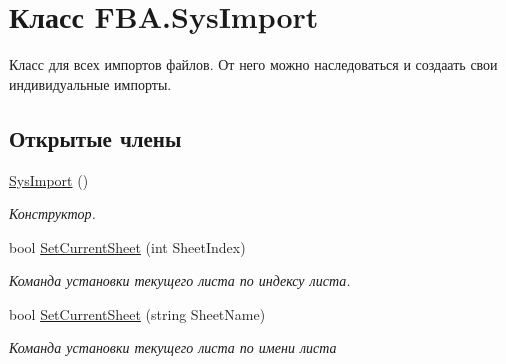 \hypertarget{class_f_b_a_1_1_sys_import}{}\section{Класс F\+B\+A.\+Sys\+Import}
\label{class_f_b_a_1_1_sys_import}


Класс для всех импортов файлов. От него можно наследоваться и создаать свои индивидуальные импорты.  


\subsection*{Открытые члены}
\begin{DoxyCompactItemize}
\item 
\mbox{\hyperlink{class_f_b_a_1_1_sys_import_a95e27f0adbca1a2f8d289e604164f520}{Sys\+Import}} ()
\begin{DoxyCompactList}\small\item\em Конструктор. \end{DoxyCompactList}\item 
bool \mbox{\hyperlink{class_f_b_a_1_1_sys_import_ab078f21c83d256d6f76861d62b34b5f4}{Set\+Current\+Sheet}} (int Sheet\+Index)
\begin{DoxyCompactList}\small\item\em Команда установки текущего листа по индексу листа. \end{DoxyCompactList}\item 
bool \mbox{\hyperlink{class_f_b_a_1_1_sys_import_a7b3f7023e3aad70b531bb2e30f315f66}{Set\+Current\+Sheet}} (string Sheet\+Name)
\begin{DoxyCompactList}\small\item\em Команда установки текущего листа по имени листа \end{DoxyCompactList}\end{DoxyCompactItemize}
